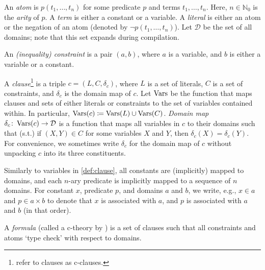 An \emph{atom} is $p(t_1, \dots, t_n)$ for some predicate $p$ and terms
$t_{1}, \dots, t_{n}$. Here, $n \in \mathbb{N}_0$ is the \emph{arity} of $p$. A
\emph{term} is either a constant or a variable. A \emph{literal} is either an
atom or the negation of an atom (denoted by $\neg p(t_1, \dots, t_n)$). Let
$\mathcal{D}$ be the set of all domains; note that this set expands during
compilation.

\begin{definition}[Constraint]\label{def:constraint}
  An \emph{(inequality) constraint} is a pair $(a, b)$, where $a$ is a variable,
  and $b$ is either a variable or a constant.
\end{definition}

\begin{definition}[Clause]\label{def:clause}
  A \emph{clause}\footnote{\citet{DBLP:conf/ijcai/BroeckTMDR11} refer to clauses
    as c-clauses.} is a triple $c = (L, C, \delta_c)$, where $L$ is a set of
  literals, $C$ is a set of constraints, and $\delta_c$ is the domain map of
  $c$. Let $\operatorname{Vars}$ be the function that maps clauses and sets of either literals
  or constraints to the set of variables contained within. In particular,
  $\operatorname{Vars}(c) \coloneqq \operatorname{Vars}(L) \cup \operatorname{Vars}(C)$. \emph{Domain map}
  $\delta_{c}\colon \operatorname{Vars}(c) \to \mathcal{D}$ is a function that maps all
  variables in $c$ to their domains such that (s.t.) if $(X, Y) \in C$ for some
  variables $X$ and $Y$, then $\delta_c(X) = \delta_c(Y)$. For convenience, we
  sometimes write $\delta_c$ for the domain map of $c$ without unpacking $c$
  into its three constituents.
\end{definition}

Similarly to variables in \cref{def:clause}, all constants are (implicitly)
mapped to domains, and each $n$-ary predicate is implicitly mapped to a sequence
of $n$ domains. For constant $x$, predicate $p$, and domains $a$ and $b$, we
write, e.g., $x \in a$ and $p \in a \times b$ to denote that $x$ is associated
with $a$, and $p$ is associated with $a$ and $b$ (in that order).

\begin{definition}[Formula]\label{def:formula}
  A \emph{formula} (called a c-theory by \citet{DBLP:conf/ijcai/BroeckTMDR11})
  is a set of clauses such that all constraints and atoms `type check' with
  respect to domains.
\end{definition}

